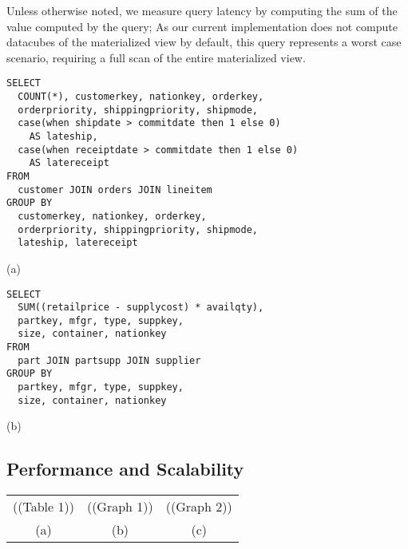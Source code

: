 Unless otherwise noted, we measure query latency by computing the sum of the value computed by the query; As our current implementation does not compute datacubes of the materialized view by default, this query represents a worst case scenario, requiring a full scan of the entire materialized view.

\begin{figure*}
\begin{center}
\begin{minipage}{3.4in}
\begin{verbatim}
SELECT
  COUNT(*), customerkey, nationkey, orderkey, 
  orderpriority, shippingpriority, shipmode,
  case(when shipdate > commitdate then 1 else 0) 
    AS lateship,
  case(when receiptdate > commitdate then 1 else 0) 
    AS latereceipt
FROM
  customer JOIN orders JOIN lineitem
GROUP BY
  customerkey, nationkey, orderkey, 
  orderpriority, shippingpriority, shipmode,
  lateship, latereceipt
\end{verbatim}
\begin{center}
(a)
\end{center}
\end{minipage}
\begin{minipage}{3.4in}
\begin{verbatim}
SELECT
  SUM((retailprice - supplycost) * availqty), 
  partkey, mfgr, type, suppkey, 
  size, container, nationkey
FROM
  part JOIN partsupp JOIN supplier
GROUP BY
  partkey, mfgr, type, suppkey, 
  size, container, nationkey
\end{verbatim}
\begin{center}
(b)
\end{center}
\end{minipage}
\end{center}
\caption{Example queries used in evaluating sliceDBread.  (a) A COL query class example that produces a materialized view for analysis of order fulfilment delays, and (b) A PPsS query class example that produces a materialized view for analysis of potential asset acquisition.}
\label{fig:experimentqueries}
\end{figure*}

\subsection{Performance and Scalability}
\label{sec:exp:performance}
\label{sec:exp:scalability}

\begin{figure*}
\begin{center}
\begin{tabular}{ccc}
((Table 1)) & ((Graph 1)) & ((Graph 2)) \\
(a) & (b) & (c)
\end{tabular}
\caption{Baseline performance characteristics of sliceDBread.  (a) Per-node memory usage for a range of data-sizes and query classes.  (b) Average CPU usage at each node for a fixed-size cluster as data update rate increases.  (c) Network bandwidth usage across the network as data update rate increases.}
\label{fig:performance}
\end{center}
\end{figure*}

